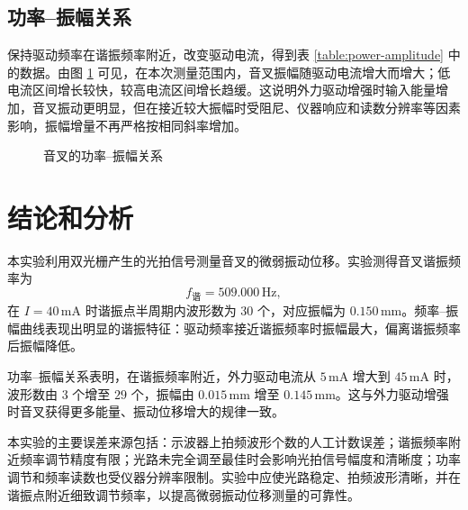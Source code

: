 \documentclass{../template/myrpt}
\begin{document}
\subsection{功率--振幅关系}

保持驱动频率在谐振频率附近，改变驱动电流，得到表 \ref{table:power-amplitude} 中的数据。由图 \ref{fig:power-amplitude} 可见，在本次测量范围内，音叉振幅随驱动电流增大而增大；低电流区间增长较快，较高电流区间增长趋缓。这说明外力驱动增强时输入能量增加，音叉振动更明显，但在接近较大振幅时受阻尼、仪器响应和读数分辨率等因素影响，振幅增量不再严格按相同斜率增加。

\begin{figure}[htbp]
  \centering
  \caption{音叉的功率--振幅关系}
  \label{fig:power-amplitude}
\end{figure}

\section{结论和分析}

本实验利用双光栅产生的光拍信号测量音叉的微弱振动位移。实验测得音叉谐振频率为
\[
  f_{\text{谐}}=509.000\,\si{\hertz},
\]
在 $I=40\,\si{\milli\ampere}$ 时谐振点半周期内波形数为 $30$ 个，对应振幅为 $0.150\,\si{\milli\metre}$。频率--振幅曲线表现出明显的谐振特征：驱动频率接近谐振频率时振幅最大，偏离谐振频率后振幅降低。

功率--振幅关系表明，在谐振频率附近，外力驱动电流从 $5\,\si{\milli\ampere}$ 增大到 $45\,\si{\milli\ampere}$ 时，波形数由 $3$ 个增至 $29$ 个，振幅由 $0.015\,\si{\milli\metre}$ 增至 $0.145\,\si{\milli\metre}$。这与外力驱动增强时音叉获得更多能量、振动位移增大的规律一致。

本实验的主要误差来源包括：示波器上拍频波形个数的人工计数误差；谐振频率附近频率调节精度有限；光路未完全调至最佳时会影响光拍信号幅度和清晰度；功率调节和频率读数也受仪器分辨率限制。实验中应使光路稳定、拍频波形清晰，并在谐振点附近细致调节频率，以提高微弱振动位移测量的可靠性。

\insertSignedDataPage
\end{document}
